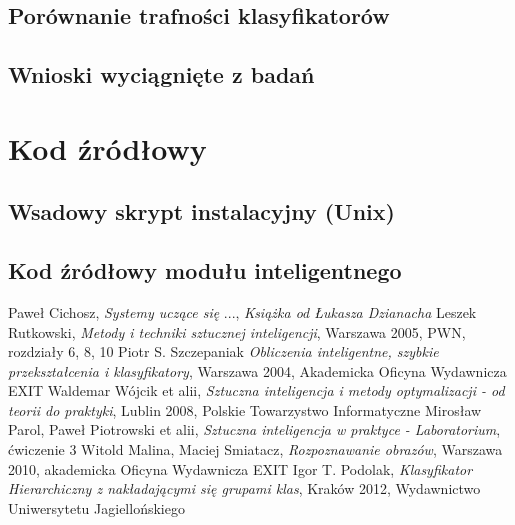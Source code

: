 \documentclass[11pt]{article} %
\begin{document}
\subsection{Porównanie trafności klasyfikatorów}
\subsection{Wnioski wyciągnięte z badań}
\section{Kod źródłowy}
\subsection{Wsadowy skrypt instalacyjny (Unix)}
\subsection{Kod źródłowy modułu inteligentnego}


\begin{thebibliography}{9}
 Paweł Cichosz, \emph{Systemy uczące się}
 ..., \emph{Książka od Łukasza Dzianacha}
 Leszek Rutkowski, \emph{Metody i techniki sztucznej inteligencji}, Warszawa 2005, PWN, rozdziały 6, 8, 10
 Piotr S. Szczepaniak \emph{Obliczenia inteligentne, szybkie przekształcenia i klasyfikatory}, Warszawa 2004, Akademicka Oficyna Wydawnicza EXIT
 Waldemar Wójcik et alii, \emph{Sztuczna inteligencja i metody optymalizacji - od teorii do praktyki}, Lublin 2008, Polskie Towarzystwo Informatyczne
 Mirosław Parol, Paweł Piotrowski et alii, \emph{Sztuczna inteligencja w praktyce - Laboratorium}, ćwiczenie 3
 Witold Malina, Maciej Smiatacz, \emph{Rozpoznawanie obrazów}, Warszawa 2010, akademicka Oficyna Wydawnicza EXIT
 Igor T. Podolak, \emph{Klasyfikator Hierarchiczny z nakładającymi się grupami klas}, Kraków 2012, Wydawnictwo Uniwersytetu Jagiellońskiego
\end{thebibliography}
\end{document}
